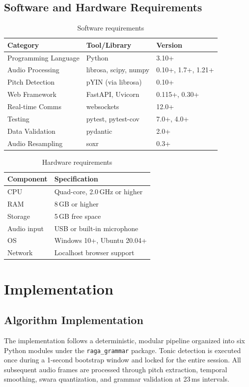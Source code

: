\documentclass[12pt,a4paper]{report}
\numberwithin{equation}{chapter}
\begin{document}
\section{Software and Hardware Requirements}
\begin{table}[htbp]
\centering
\caption{Software requirements}
\label{tab:software-req}
\begin{tabular}{|l|l|l|}
\hline
\textbf{Category} & \textbf{Tool/Library} & \textbf{Version} \\
\hline
Programming Language & Python & 3.10+ \\
Audio Processing & librosa, scipy, numpy & 0.10+, 1.7+, 1.21+ \\
Pitch Detection & pYIN (via librosa) & 0.10+ \\
Web Framework & FastAPI, Uvicorn & 0.115+, 0.30+ \\
Real-time Comms & websockets & 12.0+ \\
Testing & pytest, pytest-cov & 7.0+, 4.0+ \\
Data Validation & pydantic & 2.0+ \\
Audio Resampling & soxr & 0.3+ \\
\hline
\end{tabular}
\end{table}

\begin{table}[htbp]
\centering
\caption{Hardware requirements}
\label{tab:hardware-req}
\begin{tabular}{|l|l|}
\hline
\textbf{Component} & \textbf{Specification} \\
\hline
CPU & Quad-core, 2.0\,GHz or higher \\
RAM & 8\,GB or higher \\
Storage & 5\,GB free space \\
Audio input & USB or built-in microphone \\
OS & Windows 10+, Ubuntu 20.04+ \\
Network & Localhost browser support \\
\hline
\end{tabular}
\end{table}

\chapter{Implementation}
\section{Algorithm Implementation}
The implementation follows a deterministic, modular pipeline organized into six Python modules under the \texttt{raga\_grammar} package. Tonic detection is executed once during a 1-second bootstrap window and locked for the entire session. All subsequent audio frames are processed through pitch extraction, temporal smoothing, swara quantization, and grammar validation at 23\,ms intervals.
\end{document}
